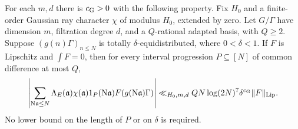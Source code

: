 \begin{proposition}
\label{gi-minor-arc}
For each $m,d$ there is $c_{\rm G}>0$ with the following property.
Fix $H_0$ and a finite-order Gaussian ray character $\chi$ of modulus
$H_0$, extended by zero.  Let $G/\Gamma$ have dimension $m$, filtration
degree $d$, and a $Q$-rational adapted basis, with $Q\geq2$.  Suppose
$(g(n)\Gamma)_{n\leq N}$ is totally $\delta$-equidistributed, where
$0<\delta<1$.  If $F$ is Lipschitz and $\int F=0$, then for every
interval progression $P\subseteq[N]$ of common difference at most $Q$,
\begin{equation}\label{gi-power-bound}
 \left|\sum_{\mathrm N\mathfrak a\leq N}\Lambda_E(\mathfrak a)
       \chi(\mathfrak a)1_P(\mathrm N\mathfrak a)
       F(g(\mathrm N\mathfrak a)\Gamma)\right|
 \ll_{H_0,m,d} QN\log(2N)^7\delta^{c_{\rm G}}\|F\|_{\mathrm{Lip}}.
\end{equation}
No lower bound on the length of $P$ or on $\delta$ is required.
\end{proposition}
